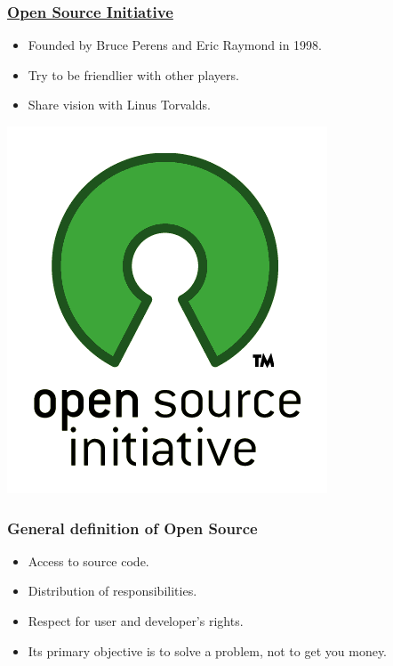 \documentclass[hyperref={pdfpagelabels=false},xcolor=pst,pdf,fragile]{beamer}
\begin{document}
\begin{frame}
  \frametitle{
	  \href{http://opensource.org/}
	  {Open Source Initiative}
  }

  \begin{itemize}
	\item Founded by Bruce Perens and Eric Raymond in 1998.
	\item Try to be friendlier with other players.
	\item Share vision with Linus Torvalds.
  \end{itemize}

  \begin{center}
	  \includegraphics[scale=0.3]{img/osi_standard_logo.png}
  \end{center}

\end{frame}


\begin{frame}
  \frametitle{General definition of Open Source}

  \begin{itemize}
	\item Access to source code.
	\item Distribution of responsibilities.
	\item Respect for user and developer's rights.
	\item Its primary objective is to solve a problem, not to get you money.
  \end{itemize}

\end{frame}
\end{document}
